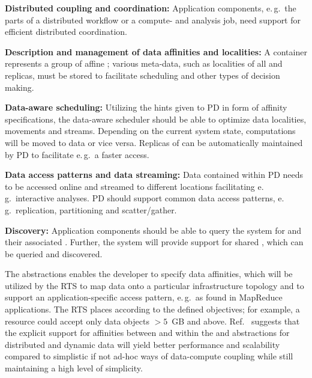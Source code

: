 \documentclass[conference]{IEEEtran}
\begin{document}

\begin{compactitem}
\item \textbf{Distributed coupling and coordination:} Application
  components, e.\,g.\ the parts of a distributed workflow or a
  compute- and analysis job, need support for efficient distributed
  coordination.
\item \textbf{Description and management of data affinities and
    localities:} A \pd container represents a group of affine
  \dataunits; %
  various meta-data, such as localities of all \dataunits and
  replicas, must be stored to facilitate scheduling and other types of
  decision making.
\item \textbf{Data-aware scheduling:} Utilizing the hints given to PD
  in form of affinity specifications, the data-aware scheduler should
  be able to optimize data localities, movements and
  streams. Depending on the current system state, computations will be
  moved to data or vice versa. Replicas of \dataunits can be
  automatically maintained by PD to facilitate e.\,g.\ a faster
  access.
\item \textbf{Data access patterns and data streaming:} Data contained
  within PD needs to be accessed online and streamed to different
  locations facilitating e.\,g.\ interactive analyses.  PD should
  support common data access patterns, e.\,g.\ replication,
  partitioning and scatter/gather.
\item \textbf{Discovery:} Application components should be able to
  query the system for \dataunits and their associated
  \pilots. Further, the system will provide support for shared \dus,
  which can be queried and discovered.
\end{compactitem}

The abstractions enables the
developer to specify data affinities, which will be utilized by the RTS to
map data onto a particular infrastructure topology and to support an
application-specific access pattern, e.\,g.\ as found in MapReduce
applications. The RTS places \dataunits according to the defined
objectives; for example, a resource could accept only data objects
$>5$~GB and above.  Ref.~\cite{ddia_ptrsa10} suggests that the
explicit support for affinities between and within the \pj and \pd
abstractions for distributed and dynamic data will yield better
performance and scalability compared to simplistic if not ad-hoc ways
of data-compute coupling while still maintaining a high level of
simplicity.
\end{document}
